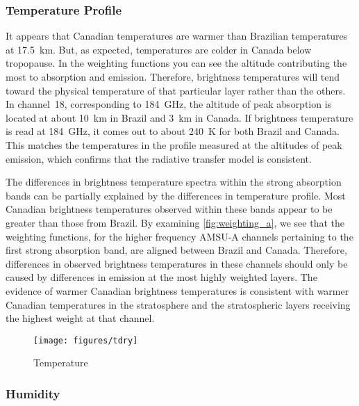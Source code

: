 \documentclass[twocol]{ametsoc}
\begin{document}
\subsubsection{Temperature Profile}

It appears that Canadian temperatures are warmer than Brazilian temperatures at 17.5~km.
But, as expected, temperatures are colder in Canada below tropopause.
In the weighting functions you can see the altitude contributing the most to absorption and emission. Therefore, brightness temperatures will tend toward the physical temperature of that particular layer rather than the others.
In channel~18, corresponding to 184~GHz, the altitude of peak absorption is located at about 10~km in Brazil and 3~km in Canada.
If brightness temperature is read at 184~GHz, it comes out to about 240~K for both Brazil and Canada.
This matches the temperatures in the profile measured at the altitudes of peak emission, which confirms that the radiative transfer model is consistent.

The differences in brightness temperature spectra within the strong absorption bands can be partially explained by the differences in temperature profile.
Most Canadian brightness temperatures observed within these bands appear to be greater than those from Brazil.
By examining \autoref{fig:weighting_a}, we see that the weighting functions, for the higher frequency AMSU-A channels pertaining to the first strong absorption band, are aligned between Brazil and Canada.
Therefore, differences in observed brightness temperatures in these channels should only be caused by differences in emission at the most highly weighted layers.
The evidence of warmer Canadian brightness temperatures is consistent with warmer Canadian temperatures in the stratosphere and the stratospheric layers receiving the highest weight at that channel.

\begin{figure}
	\centering
	\texttt{[image: figures/tdry]}
	\caption{Temperature}
	\label{fig:tdry}
\end{figure}

\subsubsection{Humidity}
\end{document}
